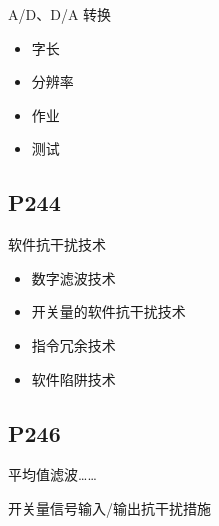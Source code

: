 \documentclass[zihao=-4
]{ctexart}%
\begin{document}
A/D、D/A 转换

\begin{itemize}
\item
  字长
\item
  分辨率
\item
  作业
\item
  测试
\end{itemize}

\hypertarget{header-n256}{%
\subsection{P244}\label{header-n256}}

软件抗干扰技术

\begin{itemize}
\item
  数字滤波技术
\item
  开关量的软件抗干扰技术
\item
  指令冗余技术
\item
  软件陷阱技术
\end{itemize}

\hypertarget{header-n267}{%
\subsection{P246}\label{header-n267}}

平均值滤波\ldots\ldots{}

开关量信号输入/输出抗干扰措施
\end{document}
